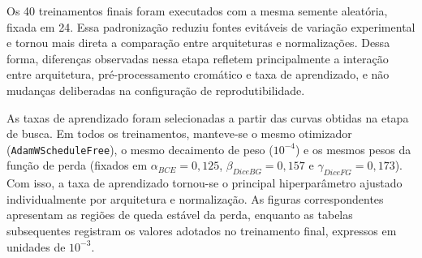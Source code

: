 \begin{table}[!htb]
\centering
\caption{Resultados de validação dos \textit{checkpoints} com normalização Vahadane em DIAGSET.}
\label{tab:results_diagset-training-vahadane}
\scriptsize
{}
\end{table}

Os 40 treinamentos finais foram executados com a mesma semente aleatória, fixada em 24. Essa padronização reduziu fontes evitáveis de variação experimental e tornou mais direta a comparação entre arquiteturas e normalizações. Dessa forma, diferenças observadas nessa etapa refletem principalmente a interação entre arquitetura, pré-processamento cromático e taxa de aprendizado, e não mudanças deliberadas na configuração de reprodutibilidade.

As taxas de aprendizado foram selecionadas a partir das curvas obtidas na etapa de busca. Em todos os treinamentos, manteve-se o mesmo otimizador (\texttt{AdamWScheduleFree}), o mesmo decaimento de peso (\(10^{-4}\)) e os mesmos pesos da função de perda (fixados em \(\alpha_{BCE}=0{,}125\), \(\beta_{DiceBG}=0{,}157\) e
\(\gamma_{DiceFG}=0{,}173\)). Com isso, a taxa de aprendizado tornou-se o principal hiperparâmetro ajustado individualmente por arquitetura e normalização. As figuras correspondentes apresentam as regiões de queda estável da perda, enquanto as tabelas subsequentes registram os valores adotados no treinamento final, expressos em unidades de \(10^{-3}\).

